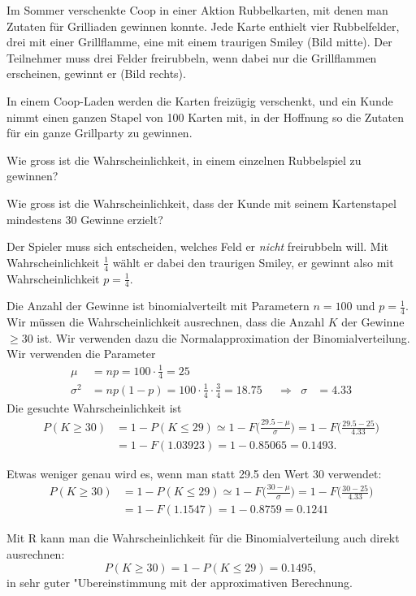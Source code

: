 Im Sommer verschenkte Coop in einer Aktion Rubbelkarten, mit denen
man Zutaten für Grilliaden gewinnen konnte.
Jede Karte enthielt vier Rubbelfelder, drei mit einer Grillflamme,
eine mit einem traurigen Smiley (Bild mitte).
Der Teilnehmer muss drei Felder freirubbeln, wenn dabei nur die Grillflammen
erscheinen, gewinnt er (Bild rechts).
\begin{center}
\end{center}
In einem Coop-Laden werden die Karten freizügig verschenkt, und ein Kunde
nimmt einen ganzen Stapel von 100 Karten mit, in der Hoffnung so die Zutaten
für ein ganze Grillparty zu gewinnen.

\begin{teilaufgaben}
\item Wie gross ist die Wahrscheinlichkeit, in einem einzelnen Rubbelspiel zu
gewinnen?
\item Wie gross ist die Wahrscheinlichkeit, dass der Kunde mit seinem 
Kartenstapel mindestens  30 Gewinne erzielt?
\end{teilaufgaben}


\begin{loesung}
\begin{teilaufgaben}
\item
Der Spieler muss sich entscheiden, welches Feld er {\em nicht} freirubbeln will.
Mit Wahrscheinlichkeit $\frac14$ wählt er dabei den traurigen Smiley,
er gewinnt also mit Wahrscheinlichkeit $p=\frac14$.
\item
Die Anzahl der Gewinne ist binomialverteilt mit Parametern $n=100$ und
$p=\frac14$.
Wir müssen die Wahrscheinlichkeit ausrechnen, dass die Anzahl $K$ der
Gewinne $\ge 30$ ist. 
Wir verwenden dazu die Normalapproximation der Binomialverteilung.
Wir verwenden die Parameter
\[
\begin{aligned}
\mu&=np = 100\cdot \frac14=25\\
\sigma^2&=np(1-p)=100\cdot\frac14\cdot\frac34=18.75&&\Rightarrow&\sigma&=4.33
\end{aligned}
\]
Die gesuchte Wahrscheinlichkeit ist
\begin{align*}
P(K\ge 30)
&=1-P(K \le 29)
\simeq
1-F\biggl(\frac{29.5-\mu}{\sigma}\biggr)
=
1-F\biggl(\frac{29.5-25}{4.33}\biggr)
\\
&=
1-F(1.03923)=1-0.85065=0.1493.
\end{align*}

Etwas weniger genau wird es, wenn man statt 29.5 den Wert 30 verwendet:
\begin{align*}
P(K\ge 30)
&=1-P(K \le 29)
\simeq
1-F\biggl(\frac{30-\mu}{\sigma}\biggr)
=
1-F\biggl(\frac{30-25}{4.33}\biggr)
\\
&=
1-F(1.1547)=1-0.8759=0.1241
\end{align*}


Mit R kann man die Wahrscheinlichkeit für die Binomialverteilung
auch direkt ausrechnen:
\[
P(K\ge 30)
=1-P(K\le 29)=0.1495,
\]
in sehr guter "Ubereinstimmung mit der approximativen Berechnung.
\qedhere
\end{teilaufgaben}
\end{loesung}

